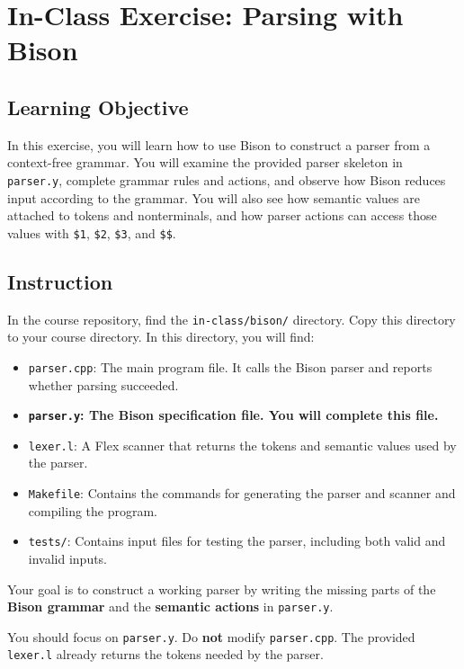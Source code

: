 \documentclass[12pt]{article}
\begin{document}
\section*{In-Class Exercise: Parsing with Bison}

\subsection*{Learning Objective}

In this exercise, you will learn how to use Bison to construct a parser from a context-free grammar. You will examine the provided parser skeleton in \texttt{parser.y}, complete grammar rules and actions, and observe how Bison reduces input according to the grammar. You will also see how semantic values are attached to tokens and nonterminals, and how parser actions can access those values with \texttt{\$1}, \texttt{\$2}, \texttt{\$3}, and \texttt{\$\$}.

\subsection*{Instruction}

In the course repository, find the \texttt{in-class/bison/} directory.
Copy this directory to your course directory.
In this directory, you will find:
%
\begin{itemize}
    \item \texttt{parser.cpp}: The main program file. It calls the Bison parser and reports whether parsing succeeded.
    \item \textbf{\texttt{parser.y}: The Bison specification file. You will complete this file.}
    \item \texttt{lexer.l}: A Flex scanner that returns the tokens and semantic values used by the parser.
    \item \texttt{Makefile}: Contains the commands for generating the parser and scanner and compiling the program.
    \item \texttt{tests/}: Contains input files for testing the parser, including both valid and invalid inputs.
\end{itemize}

Your goal is to construct a working parser by writing the missing parts of the \textbf{Bison grammar} and the \textbf{semantic actions} in \texttt{parser.y}.

You should focus on \texttt{parser.y}. Do \textbf{not} modify \texttt{parser.cpp}. The provided \texttt{lexer.l} already returns the tokens needed by the parser.
\end{document}
